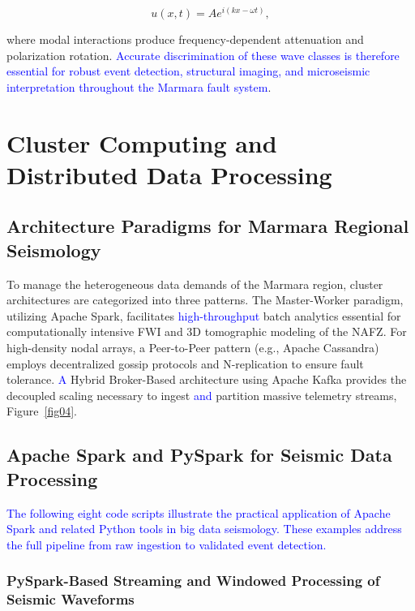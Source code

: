 \documentclass[data,article,submit,pdftex,moreauthors]{Definitions/mdpi}
\begin{document}
\begin{equation}
\label{eq:wave_displacement_field}
u(x,t) = A e^{i(kx-\omega t)},
\end{equation}

where modal interactions produce frequency-dependent attenuation and polarization rotation. \textcolor{blue}{Accurate discrimination of these wave classes is therefore essential for robust event detection, structural imaging, and microseismic interpretation throughout the Marmara fault system}.

\section{Cluster Computing and Distributed Data Processing}

\subsection{Architecture Paradigms for Marmara Regional Seismology}

To manage the heterogeneous data demands of the Marmara region, cluster architectures are categorized into three patterns. The Master-Worker paradigm, utilizing Apache Spark, facilitates \textcolor{blue}{high-throughput} batch analytics essential for computationally intensive FWI and 3D tomographic modeling of the NAFZ. For high-density nodal arrays, a Peer-to-Peer pattern (e.g., Apache Cassandra) employs decentralized gossip protocols and N-replication to ensure fault tolerance. \textcolor{blue}{A} Hybrid Broker-Based architecture using Apache Kafka provides the decoupled scaling necessary to ingest \textcolor{blue}{and} partition massive telemetry streams, Figure~\ref{fig04}.

\subsection{Apache Spark and PySpark for Seismic Data Processing}

\textcolor{blue}{The following eight code scripts illustrate the practical application of Apache Spark and related Python tools in big data seismology. These examples address the full pipeline from raw ingestion to validated event detection.}

\subsubsection{PySpark-Based Streaming and Windowed Processing of Seismic Waveforms}
\end{document}
